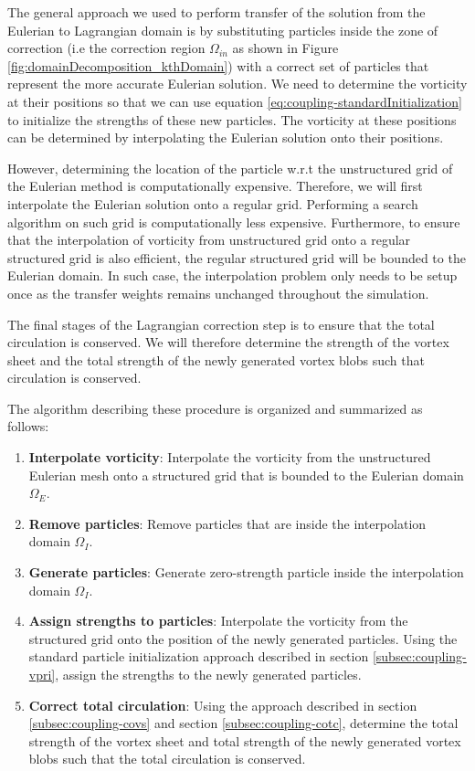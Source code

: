 	The general approach we used to perform transfer of the solution from the Eulerian to Lagrangian domain is by substituting particles inside the zone of correction (i.e the correction region $\Omega_{in}$ as shown in Figure \ref{fig:domainDecomposition_kthDomain}) with a correct set of particles that represent the more accurate Eulerian solution. We need to determine the vorticity at their positions so that we can use equation \ref{eq:coupling-standardInitialization} to initialize the strengths of these new particles. The vorticity at these positions can be determined by interpolating the Eulerian solution onto their positions. 
	
	However, determining the location of the particle w.r.t the unstructured grid of the Eulerian method is computationally expensive. Therefore, we will first interpolate the Eulerian solution onto a regular grid. Performing a search algorithm on such grid is computationally less expensive. Furthermore, to ensure that the interpolation of vorticity from unstructured grid onto a regular structured grid is also efficient, the regular structured grid will be bounded to the Eulerian domain. In such case, the interpolation problem only needs to be setup once as the transfer weights remains unchanged throughout the simulation. 
	
	The final stages of the Lagrangian correction step is to ensure that the total circulation is conserved. We will therefore determine the strength of the vortex sheet and the total strength of the newly generated vortex blobs such that circulation is conserved.
	
	The algorithm describing these procedure is organized and summarized as follows:
	\begin{enumerate}
	\item \textbf{Interpolate vorticity}: Interpolate the vorticity from the unstructured Eulerian mesh onto a structured grid that is bounded to the Eulerian domain $\Omega_E$.
	\item \textbf{Remove particles}: Remove particles that are inside the interpolation domain $\Omega_{I}$.
	\item \textbf{Generate particles}: Generate zero-strength particle inside the interpolation domain $\Omega_{I}$.
	\item \textbf{Assign strengths to particles}: Interpolate the vorticity from the structured grid onto the position of the newly generated particles. Using the standard particle initialization approach described in section \ref{subsec:coupling-vpri}, assign the strengths to the newly generated particles. 
	\item \textbf{Correct total circulation}: Using the approach described in section \ref{subsec:coupling-covs} and section \ref{subsec:coupling-cotc}, determine the total strength of the vortex sheet and total strength of the newly generated vortex blobs such that the total circulation is conserved.
	\end{enumerate}
	
